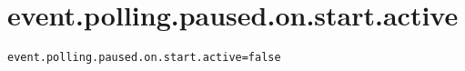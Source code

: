 \section{event.polling.paused.on.start.active}
\label{configuration:EventPollingPausedOnStartActive}
\AvailableInJavaAndCsharp{\TODO}
\begin{lstlisting}[style=Props,caption={Usage example for \textit{event.polling.paused.on.start.active}}]
event.polling.paused.on.start.active=false
\end{lstlisting}